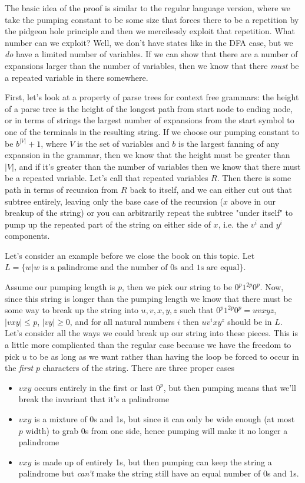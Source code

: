 \documentclass[11pt]{article}
\begin{document}
The basic idea of the proof is similar to the regular language version, where we take the pumping constant to be some size that forces there to be a repetition by the pidgeon hole principle and then we mercilessly exploit that repetition. What number can we exploit? Well, we don't have states like in the DFA case, but we \emph{do} have a limited number of variables. If we can show that there are a number of expansions larger than the number of variables, then we know that there \emph{must} be a repeated variable in there somewhere. 

First, let's look at a property of parse trees for context free grammars: the height of a parse tree is the height of the longest path from start node to ending node, or in terms of strings the largest number of expansions from the start symbol to one of the terminals in the resulting string. If we choose our pumping constant to be $b^{|V|} + 1$, where $V$ is the set of variables and $b$ is the largest fanning of any expansion in the grammar, then we know that the height must be greater than $|V|$, and if it's greater than the number of variables then we know that there must be a repeated variable. Let's call that repeated variables $R$. Then there is some path in terms of recursion from $R$ back to itself, and we can either cut out that subtree entirely, leaving only the base case of the recursion ($x$ above in our breakup of the string) or you can arbitrarily repeat the subtree "under itself" to pump up the repeated part of the string on either side of $x$, i.e. the $v^i$ and $y^i$ components. 

Let's consider an example before we close the book on this topic. Let $L = \{ w | w \text{ is a palindrome and the number of 0s and 1s are equal}\}$.

Assume our pumping length is $p$, then we pick our string to be $0^p1^{2p}0^p$. Now, since this string is longer than the pumping length we know that there must be some way to break up the string into $u,v,x,y,z$ such that $0^p1^{2p}0^p = uvxyz$, $|vxy| \le p$, $|vy| \ge 0$, and for all natural numbers $i$ then $uv^ixy^z$ should be in $L$. Let's consider all the ways we could break up our string into these pieces. This is a little more complicated than the regular case because we have the freedom to pick $u$ to be as long as we want rather than having the loop be forced to occur in the \emph{first} $p$ characters of the string. There are three proper cases

\begin{itemize}
\item $vxy$ occurs entirely in the first or last $0^p$, but then pumping means that we'll break the invariant that it's a palindrome
\item $vxy$ is a mixture of 0s and 1s, but since it can only be wide enough (at most $p$ width) to grab 0s from one side, hence pumping will make it no longer a palindrome
\item $vxy$ is made up of entirely 1s, but then pumping can keep the string a palindrome but \emph{can't} make the string still have an equal number of 0s and 1s.
\end{itemize}
\end{document}
